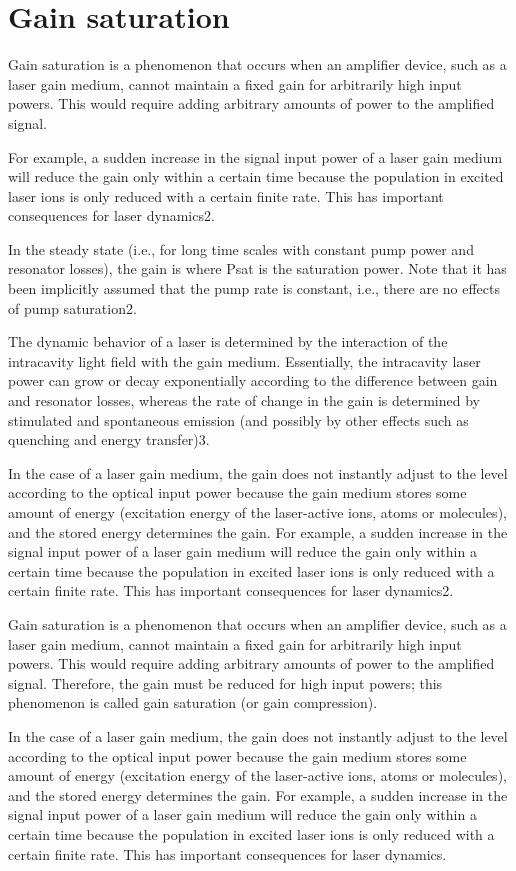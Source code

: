 \section{Gain saturation}

Gain saturation is a phenomenon that occurs when an amplifier device, such as a laser gain medium, cannot maintain a fixed gain for arbitrarily high input powers. This would require adding arbitrary amounts of power to the amplified signal.

For example, a sudden increase in the signal input power of a laser gain medium will reduce the gain only within a certain time because the population in excited laser ions is only reduced with a certain finite rate. This has important consequences for laser dynamics2.

In the steady state (i.e., for long time scales with constant pump power and resonator losses), the gain is where Psat is the saturation power. Note that it has been implicitly assumed that the pump rate is constant, i.e., there are no effects of pump saturation2.

The dynamic behavior of a laser is determined by the interaction of the intracavity light field with the gain medium. Essentially, the intracavity laser power can grow or decay exponentially according to the difference between gain and resonator losses, whereas the rate of change in the gain is determined by stimulated and spontaneous emission (and possibly by other effects such as quenching and energy transfer)3.

In the case of a laser gain medium, the gain does not instantly adjust to the level according to the optical input power because the gain medium stores some amount of energy (excitation energy of the laser-active ions, atoms or molecules), and the stored energy determines the gain. For example, a sudden increase in the signal input power of a laser gain medium will reduce the gain only within a certain time because the population in excited laser ions is only reduced with a certain finite rate. This has important consequences for laser dynamics2.

Gain saturation is a phenomenon that occurs when an amplifier device, such as a laser gain medium, cannot maintain a fixed gain for arbitrarily high input powers. This would require adding arbitrary amounts of power to the amplified signal. Therefore, the gain must be reduced for high input powers; this phenomenon is called gain saturation (or gain compression).

In the case of a laser gain medium, the gain does not instantly adjust to the level according to the optical input power because the gain medium stores some amount of energy (excitation energy of the laser-active ions, atoms or molecules), and the stored energy determines the gain. For example, a sudden increase in the signal input power of a laser gain medium will reduce the gain only within a certain time because the population in excited laser ions is only reduced with a certain finite rate. This has important consequences for laser dynamics.

